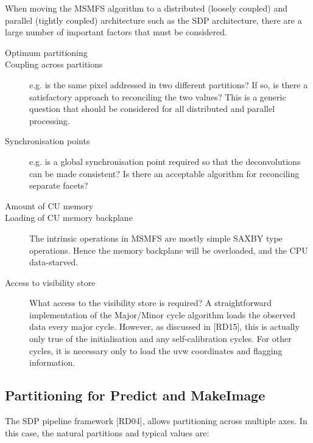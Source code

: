 \documentclass[11pt,a4paper,variablewidth]{article}
\begin{document}
When moving the MSMFS algorithm to a distributed (loosely coupled) and parallel (tightly coupled) architecture such as the SDP architecture, there are a large number of important factors that must be considered.
\begin{description}
\item[Optimum partitioning] 
\item[Coupling across partitions] e.g. is the same pixel addressed in two different partitions? If so, is there a satisfactory approach to reconciling the two values? This is a generic question that should be considered for all distributed and parallel processing.
\item[Synchronisation points] e.g. is a global synchronisation point required so that the deconvolutions can be made consistent? Is there an acceptable algorithm for reconciling separate facets?
\item[Amount of CU memory]
\item[Loading of CU memory backplane] The intrinsic operations in MSMFS are mostly simple SAXBY type operations. Hence the memory backplane will be overloaded, and the CPU data-starved.
\item[Access to visibility store] What access to the visibility store is required? A straightforward implementation of the Major/Minor cycle algorithm loads the observed data every major cycle. However, as discussed in [RD15], this is actually only true of the initialisation and any self-calibration cycles. For other cycles, it is necessary only to load the uvw coordinates and flagging information.
\end{description}

\subsection{Partitioning for Predict and MakeImage}
\label{subsec:partitoningpredictmakeimage}

The SDP pipeline framework [RD04], allows partitioning across multiple axes. In this case, the natural partitions and typical values are:
\end{document}
